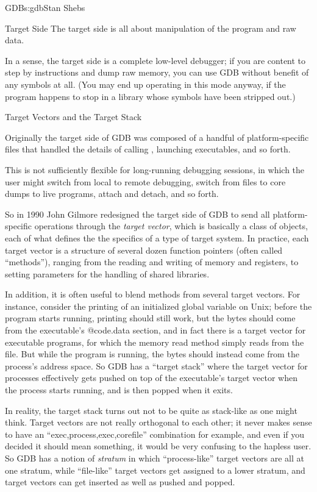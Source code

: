 \begin{aosachapter}{GDB}{s:gdb}{Stan Shebs}
\begin{aosasect1}{Target Side}
The target side is all about manipulation of the program and raw data.

In a sense, the target side is a complete low-level debugger; if you
are content to step by instructions and dump raw memory, you can use
GDB without benefit of any symbols at all.  (You may end up operating
in this mode anyway, if the program happens to stop in a library whose
symbols have been stripped out.)

\begin{aosasect2}{Target Vectors and the Target Stack}

Originally the target side of GDB was composed of a handful of
platform-specific files that handled the details of calling
, launching executables, and so forth.

This is not sufficiently flexible for long-running debugging sessions,
in which the user might switch from local to remote debugging, switch
from files to core dumps to live programs, attach and detach, and so
forth.

So in 1990 John Gilmore redesigned the target side of GDB to send all
platform-specific operations through the {\em target vector}, which is
basically a class of objects, each of what defines the the specifics
of a type of target system.  In practice, each target vector is a
structure of several dozen function pointers (often called
``methods''), ranging from the reading and writing of memory and
registers, to setting parameters for the handling of shared libraries.

In addition, it is often useful to blend methods from several target
vectors.  For instance, consider the printing of an initialized global
variable on Unix; before the program starts running, printing should
still work, but the bytes should come from the executable's
@code{.data} section, and in fact there is a target vector for
executable programs, for which the memory read method simply reads
from the file.  But while the program is running, the bytes should
instead come from the process's address space.  So GDB has a ``target
stack'' where the target vector for processes effectively gets pushed
on top of the executable's target vector when the process starts
running, and is then popped when it exits.


In reality, the target stack turns out not to be quite as stack-like
as one might think.  Target vectors are not really orthogonal to each
other; it never makes sense to have an ``exec,process,exec,corefile''
combination for example, and even if you decided it should mean
something, it would be very confusing to the hapless user.  So GDB has
a notion of {\em stratum} in which ``process-like'' target vectors are
all at one stratum, while ``file-like'' target vectors get assigned to
a lower stratum, and target vectors can get inserted as well as pushed
and popped.


\end{aosasect2}
\end{aosasect1}
\end{aosachapter}
